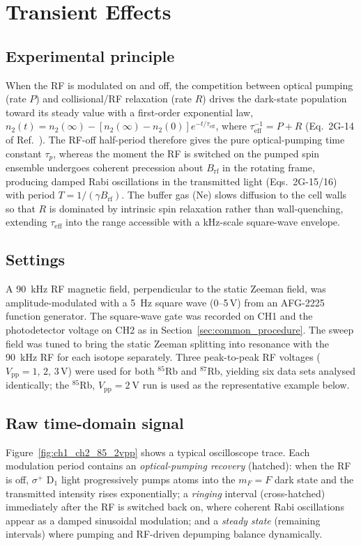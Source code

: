 \newpage
\section{Transient Effects}\label{sec:4d}

\subsection{Experimental principle}\label{sec:transient_theory}
When the RF is modulated on and off, the competition between optical
pumping (rate $P$) and collisional/RF relaxation (rate $R$) drives the
dark-state population toward its steady value with a first-order
exponential law, $n_2(t) = n_2(\infty) - [n_2(\infty)-n_2(0)]e^{-t/\tau_{\mathrm{eff}}}$,
where $\tau_{\mathrm{eff}}^{-1} = P + R$ (Eq.~2G-14 of
Ref.~\cite{OpticalPumpingRubidium2002}). The RF-off half-period therefore
gives the pure optical-pumping time constant $\tau_p$, whereas the moment
the RF is switched on the pumped spin ensemble undergoes coherent
precession about $B_{\mathrm{rf}}$ in the rotating frame, producing
damped Rabi oscillations in the transmitted light (Eqs.~2G-15/16) with
period $T = 1/(\gamma B_{\mathrm{rf}})$. The buffer gas (Ne) slows
diffusion to the cell walls so that $R$ is dominated by intrinsic spin
relaxation rather than wall-quenching, extending $\tau_{\mathrm{eff}}$
into the range accessible with a kHz-scale square-wave envelope.

\subsection{Settings}
A \SI{90}{\kilo\hertz} RF magnetic field, perpendicular to the static
Zeeman field, was amplitude-modulated with a \SI{5}{\hertz} square wave
(0--5\,V) from an AFG-2225 function generator. The square-wave gate was
recorded on CH1 and the photodetector voltage on CH2 as in
Section~\ref{sec:common_procedure}. The sweep field was tuned to bring
the static Zeeman splitting into resonance with the \SI{90}{\kilo\hertz}
RF for each isotope separately. Three peak-to-peak RF voltages
($V_{\mathrm{pp}} = 1,\,2,\,3\,\mathrm{V}$) were used for both $^{85}$Rb
and $^{87}$Rb, yielding six data sets analysed identically; the
$^{85}$Rb, $V_{\mathrm{pp}}=\SI{2}{\volt}$ run is used as the
representative example below.

\subsection{Raw time-domain signal}
Figure~\ref{fig:ch1_ch2_85_2vpp} shows a typical oscilloscope trace. Each
modulation period contains an \emph{optical-pumping recovery} (hatched):
when the RF is off, $\sigma^+$ D$_1$ light progressively pumps atoms into
the $m_F=F$ dark state and the transmitted intensity rises exponentially;
a \emph{ringing} interval (cross-hatched) immediately after the RF is
switched back on, where coherent Rabi oscillations appear as a damped
sinusoidal modulation; and a \emph{steady state} (remaining intervals)
where pumping and RF-driven depumping balance dynamically.

